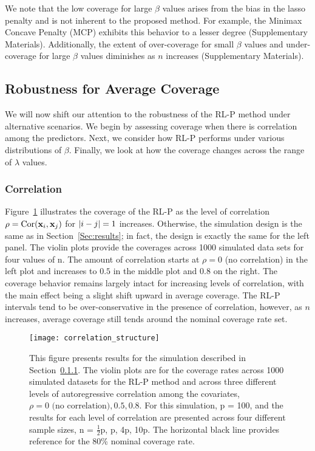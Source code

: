 We note that the low coverage for large $\beta$ values arises from the bias in the lasso penalty and is not inherent to the proposed method. For example, the Minimax Concave Penalty (MCP) exhibits this behavior to a lesser degree (Supplementary Materials). Additionally, the extent of over-coverage for small $\beta$ values and under-coverage for large $\beta$ values diminishes as $n$ increases (Supplementary Materials).

\subsection{Robustness for Average Coverage}
\label{Sec:robustness}

We will now shift our attention to the robustness of the RL-P method under alternative scenarios. We begin by assessing coverage when there is correlation among the predictors. Next, we consider how RL-P performs under various distributions of $\beta$. Finally, we look at how the coverage changes across the range of $\lambda$ values.

\subsubsection{Correlation}
\label{Sec:correlation}

Figure~\ref{Fig:correlation_structure} illustrates the coverage of the RL-P as the level of correlation $\rho = \textrm{Cor}(\mathbf{x}_i, \mathbf{x}_j)$ for $\left\lvert i-j\right\rvert = 1$ increases. Otherwise, the simulation design is the same as in Section~\ref{Sec:results}; in fact, the design is exactly the same for the left panel. The violin plots provide the coverages across 1000 simulated data sets for four values of n. The amount of correlation starts at $\rho = 0$ (no correlation) in the left plot and increases to $0.5$ in the middle plot and $0.8$ on the right. The coverage behavior remains largely intact for increasing levels of correlation, with the main effect being a slight shift upward in average coverage. The RL-P intervals tend to be over-conservative in the presence of correlation, however, as $n$ increases, average coverage still tends around the nominal coverage rate set.

\begin{figure}[htb!]
  \begin{center}
  \texttt{[image: correlation\_structure]}
  \caption{\label{Fig:correlation_structure} This figure presents results for the simulation described in Section~\ref{Sec:correlation}. The violin plots are for the coverage rates across 1000 simulated datasets for the RL-P method and across three different levels of autoregressive correlation among the covariates, $\rho = 0 \text{ (no correlation)}, 0.5, 0.8$. For this simulation, p = 100, and the results for each level of correlation are presented across four different sample sizes, n = $\frac{1}{2}$p, p, 4p, 10p. The horizontal black line provides reference for the 80\% nominal coverage rate.}
  \end{center}
\end{figure}

